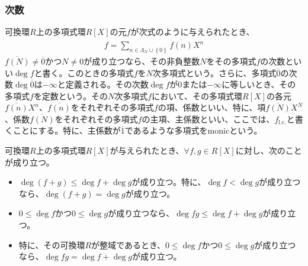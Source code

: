 \documentclass[dvipdfmx]{jsarticle}
\begin{document}
\subsubsection{次数}%
\begin{dfn}
可換環$R$上の多項式環$R[ X]$の元$f$が次式のように与えられたとき、
\begin{align*}
f = \sum_{n \in \varLambda_{N} \cup \left\{ 0 \right\}} {\overline{f(n)}X^{n}}
\end{align*}
$\overline{f(N)} \neq \overline{0}$かつ$N \neq 0$が成り立つなら、その非負整数$N$をその多項式$f$の次数といい$\deg f$と書く。このときの多項式$f$を$N$次多項式という。さらに、多項式$\overline{0}$の次数$\deg\overline{0}$は$- \infty$と定義される。その次数$\deg f$が$0$または$- \infty$に等しいとき、その多項式$f$を定数という。その$N$次多項式$f$において、その多項式環$R[ X]$の各元$\overline{f(n)}X^{n}$、$\overline{f(n)}$をそれぞれその多項式$f$の項、係数といい、特に、項$\overline{f(N)}X^{N}$、係数$\overline{f(N)}$をそれぞれその多項式$f$の主項、主係数といい、ここでは、${f}_{\mathrm{l.c.}} $と書くことにする。特に、主係数が$\overline{1}$であるような多項式をmonicという。
\end{dfn}
\begin{thm}\label{3.3.3.7}
可換環$R$上の多項式環$R[ X]$が与えられたとき、$\forall f,g \in R[ X]$に対し、次のことが成り立つ。
\begin{itemize}
\item
  $\deg(f + g) \leq \deg f + \deg g$が成り立つ。特に、$\deg f < \deg g$が成り立つなら、$\deg(f + g) = \deg g$が成り立つ。
\item
  $0 \leq \deg f$かつ$0 \leq \deg g$が成り立つなら、$\deg{fg} \leq \deg f + \deg g$が成り立つ。
\item
  特に、その可換環$R$が整域であるとき、$0 \leq \deg f$かつ$0 \leq \deg g$が成り立つなら、$\deg{fg} = \deg f + \deg g$が成り立つ。
\end{itemize}
\end{thm}
\end{document}
